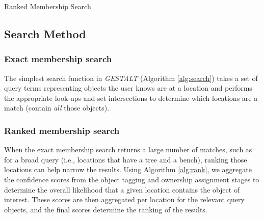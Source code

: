 \begin{algorithm}[h]
    \caption{Ranked Membership Search}\label{alg:rank}
    \begin{algorithmic}
        \State{- - - - -}
                \EndFor
            \EndFor
        \EndProcedure
    \end{algorithmic}
\end{algorithm}
\normalsize

\subsection{Search Method} \label{subsection:search-method}

\subsubsection{\textbf{Exact membership search}}
The simplest search function in \emph{GESTALT} (Algorithm \ref{alg:search}) takes a set of query terms representing objects the user knows are at a location and performs the appropriate look-ups and set intersections to determine which locations are a match (contain \textit{all} those objects).



\subsubsection{\textbf{Ranked membership search}}
When the exact membership search returns a large number of matches, such as for a broad query (i.e., locations that have a tree and a bench), ranking those locations can help narrow the results. Using Algorithm \ref{alg:rank}, we aggregate the confidence scores from the object tagging and ownership assignment stages to determine the overall likelihood that a given location contains the object of interest. These scores are then aggregated per location for the relevant query objects, and the final scores determine the ranking of the results. 




